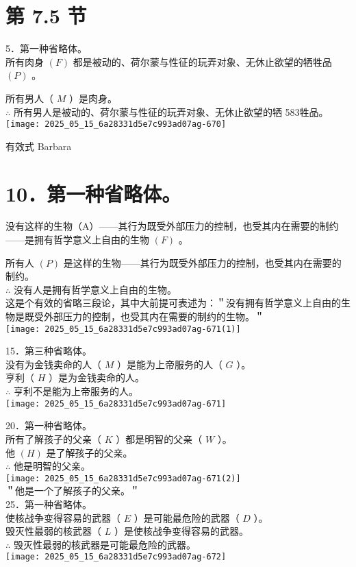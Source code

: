 \section*{第 7.5 节}
5．第一种省略体。\\
所有肉身 $(F)$ 都是被动的、荷尔蒙与性征的玩弄对象、无休止欲望的牺牲品 $(P)$ 。

所有男人（ $M$ ）是肉身。\\
$\therefore$ 所有男人是被动的、荷尔蒙与性征的玩弄对象、无休止欲望的牺 583牲品。\\
\texttt{[image: 2025\_05\_15\_6a28331d5e7c993ad07ag-670]}

有效式 Barbara

\section*{10．第一种省略体。}
没有这样的生物（A）——其行为既受外部压力的控制，也受其内在需要的制约——是拥有哲学意义上自由的生物 $(F)$ 。

所有人 $(P)$ 是这样的生物——其行为既受外部压力的控制，也受其内在需要的制约。\\
$\therefore$ 没有人是拥有哲学意义上自由的生物。\\
这是个有效的省略三段论，其中大前提可表述为：＂没有拥有哲学意义上自由的生物是既受外部压力的控制，也受其内在需要的制约的生物。＂\\
\texttt{[image: 2025\_05\_15\_6a28331d5e7c993ad07ag-671(1)]}

15．第三种省略体。\\
没有为金钱卖命的人（ $M$ ）是能为上帝服务的人（ $G$ ）。\\
亨利（ $H$ ）是为金钱卖命的人。\\
$\therefore$ 亨利不是能为上帝服务的人。\\
\texttt{[image: 2025\_05\_15\_6a28331d5e7c993ad07ag-671]}

20．第一种省略体。\\
所有了解孩子的父亲（ $K$ ）都是明智的父亲（ $W$ ）。\\
他 $(H)$ 是了解孩子的父亲。\\
$\therefore$ 他是明智的父亲。\\
\texttt{[image: 2025\_05\_15\_6a28331d5e7c993ad07ag-671(2)]}\\
＂他是一个了解孩子的父亲。＂\\
25．第一种省略体。\\
使核战争变得容易的武器（ $E$ ）是可能最危险的武器（ $D$ ）。\\
毁灭性最弱的核武器（ $L$ ）是使核战争变得容易的武器。\\
$\therefore$ 毁灭性最弱的核武器是可能最危险的武器。\\
\texttt{[image: 2025\_05\_15\_6a28331d5e7c993ad07ag-672]}

